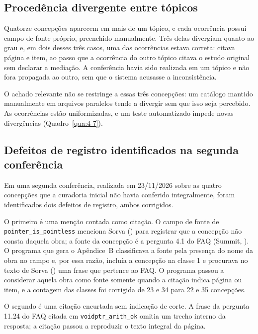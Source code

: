 \subsection{Procedência divergente entre tópicos}

Quatorze concepções aparecem em mais de um tópico, e cada ocorrência possui campo de fonte próprio, preenchido manualmente. Três delas divergiam quanto ao grau e, em dois desses três casos, uma das ocorrências estava correta: citava página e item, ao passo que a ocorrência do outro tópico citava o estudo original sem declarar a mediação. A conferência havia sido realizada em um tópico e não fora propagada ao outro, sem que o sistema acusasse a inconsistência.

O achado relevante não se restringe a essas três concepções: um catálogo mantido manualmente em arquivos paralelos tende a divergir sem que isso seja percebido. As ocorrências estão uniformizadas, e um teste automatizado impede novas divergências (Quadro~\ref{qua:4-7}).

\subsection{Defeitos de registro identificados na segunda conferência}

Em uma segunda conferência, realizada em 23/11/2026 sobre as quatro concepções que a curadoria inicial não havia conferido integralmente, foram identificados dois defeitos de registro, ambos corrigidos.

O primeiro é uma menção contada como citação. O campo de fonte de \texttt{pointer\_\allowbreak{}is\_\allowbreak{}pointless} menciona Sorva (\citeyear{sorva2012}) para registrar que a concepção não consta daquela obra; a fonte da concepção é a pergunta 4.1 do FAQ (Summit, \citeyear{summit2005}). O programa que gera o Apêndice~B classificava a fonte pela presença do nome da obra no campo e, por essa razão, incluía a concepção na classe 1 e procurava no texto de Sorva (\citeyear{sorva2012}) uma frase que pertence ao FAQ. O programa passou a considerar aquela obra como fonte somente quando a citação indica página ou item, e a contagem das classes foi corrigida de 23 e 34 para 22 e 35 concepções.

O segundo é uma citação encurtada sem indicação de corte. A frase da pergunta 11.24 do FAQ citada em \texttt{voidptr\_\allowbreak{}arith\_\allowbreak{}ok} omitia um trecho interno da resposta; a citação passou a reproduzir o texto integral da página.

